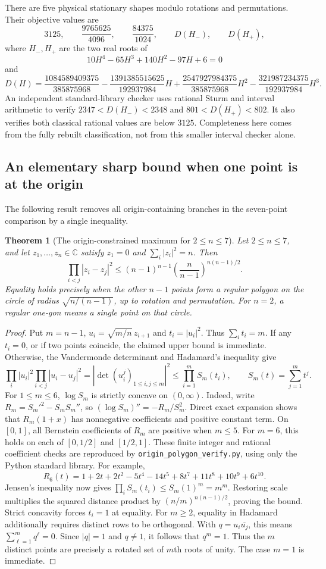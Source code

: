 \documentclass[11pt]{article}
\newtheorem{theorem}{Theorem}[section]
\theoremstyle{remark}
\numberwithin{equation}{section}
\begin{document}
There are five physical stationary shapes modulo rotations and
permutations. Their objective values are
\[
 3125,\qquad \frac{9765625}{4096},\qquad
 \frac{84375}{1024},\qquad D(H_-),\qquad D(H_+),
\]
where $H_-,H_+$ are the two real roots of
\[
 10H^4-65H^3+140H^2-97H+6=0
\]
and
\[
 D(H)=\frac{1084589409375}{385875968}
 -\frac{1391385515625}{192937984}H
 +\frac{2547927984375}{385875968}H^2
 -\frac{321987234375}{192937984}H^3.
\]
An independent standard-library checker uses rational Sturm and
interval arithmetic to verify
$2347<D(H_-)<2348$ and $801<D(H_+)<802$.
It also verifies both classical rational values are below $3125$.
Completeness here comes from the fully rebuilt classification, not
from this smaller interval checker alone.


\subsection{An elementary sharp bound when one point is at the origin}
The following result removes all origin-containing branches in the seven-point
comparison by a single inequality.
\begin{theorem}[The origin-constrained maximum for $2\le n\le7$]
Let $2\le n\le7$, and let $z_1,\ldots,z_n\in\mathbb C$ satisfy
$z_1=0$ and $\sum_i|z_i|^2=n$. Then
\[
 \prod_{i<j}|z_i-z_j|^2\le
 (n-1)^{n-1}\left(\frac n{n-1}\right)^{n(n-1)/2}.
\]
Equality holds precisely when the other $n-1$ points form a regular polygon
on the circle of radius $\sqrt{n/(n-1)}$, up to rotation and permutation.
For $n=2$, a regular one-gon means a single point on that circle.
\end{theorem}
\begin{proof}
Put $m=n-1$, $u_i=\sqrt{m/n}\,z_{i+1}$ and $t_i=|u_i|^2$.
Thus $\sum_i t_i=m$. If any $t_i=0$, or if two points coincide, the claimed
upper bound is immediate. Otherwise, the Vandermonde determinant and
Hadamard's inequality give
\[
 \prod_i|u_i|^2\prod_{i<j}|u_i-u_j|^2
 =\left|\det(u_i^j)_{1\le i,j\le m}\right|^2
 \le\prod_{i=1}^m S_m(t_i),\qquad
 S_m(t)=\sum_{j=1}^m t^j.
\]
For $1\le m\le6$, $\log S_m$ is strictly concave on $(0,\infty)$.
Indeed, write $R_m=S_m'^2-S_mS_m''$, so
$(\log S_m)''=-R_m/S_m^2$. Direct exact expansion shows that
$R_m(1+x)$ has nonnegative coefficients and positive constant term.
On $[0,1]$, all Bernstein coefficients of $R_m$ are positive when
$m\le5$. For $m=6$, this holds on each of $[0,1/2]$ and $[1/2,1]$.
These finite integer and rational coefficient checks are reproduced by
\texttt{origin\_polygon\_verify.py}, using only the Python standard library.
For example,
\[
 R_6(t)=1+2t+2t^2-5t^4-14t^5+8t^7+11t^8+10t^9+6t^{10}.
\]
Jensen's inequality now gives $\prod_iS_m(t_i)\le S_m(1)^m=m^m$.
Restoring scale multiplies the squared distance product by
$(n/m)^{n(n-1)/2}$, proving the bound.
Strict concavity forces $t_i=1$ at equality. For $m\ge2$, equality in
Hadamard additionally requires distinct rows to be orthogonal. With
$q=u_i\overline{u_j}$, this means
$\sum_{\ell=1}^m q^\ell=0$. Since $|q|=1$ and $q\ne1$, it follows that
$q^m=1$. Thus the $m$ distinct points are precisely a rotated set of
$m$th roots of unity. The case $m=1$ is immediate.
\end{proof}
\end{document}
